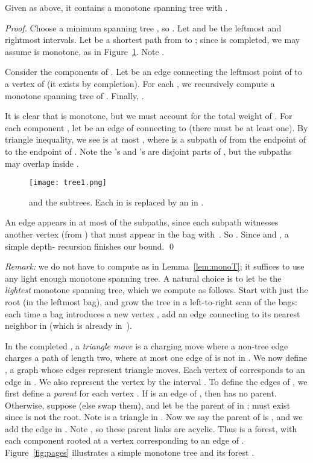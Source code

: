 \documentclass{llncs}
\begin{document}
\begin{lemma}\label{lem:monoT} Given  as above, it contains a monotone
 spanning tree  with . 
\end{lemma}
\begin{proof}
Choose a minimum spanning tree , so .
Let  and  be the leftmost and rightmost intervals.
Let  be a shortest path from  to ; since  is completed,
we may assume  is monotone, as in Figure~\ref{fig:tree1}.
Note .

Consider the components  of .
Let  be an edge connecting the leftmost point of  to a
vertex of  (it exists by completion).
For each , we recursively compute a monotone spanning tree 
of . Finally, .

It is clear that  is monotone, but we must account for the total
weight of .  For each component , let  be an edge
of  connecting  to  (there must be at least one).
By triangle inequality, we see  is at most , where  is a subpath of  from
the endpoint of  to the endpoint of .  Note the 's and
's are disjoint parts of , but the subpaths may overlap inside
.

\begin{figure}[ht]
\begin{center}
{\texttt{[image: tree1.png]}}
\caption{ and the  subtrees. Each 
 in  is replaced by an  in .}
\label{fig:tree1}
\end{center}
\end{figure}

An edge  appears in at most  of the
 subpaths, since each subpath witnesses another vertex (from
) that must appear in the bag with~.  So .  Since  and , a simple
depth- recursion finishes our bound.  \qed
\end{proof}

\noindent\emph{Remark:} we do not have to compute  as in
Lemma~\ref{lem:monoT}; it suffices to use any light enough monotone
spanning tree.  A natural choice is to let  be the \emph{lightest}
monotone spanning tree, which we compute as follows.  Start with just
the root (in the leftmost bag), and grow the tree in a left-to-right
scan of the bags: each time a bag  introduces a new vertex , add
an edge connecting  to its nearest neighbor in  (which is
already in~).

In the completed , a \emph{triangle move} is a charging move where
a non-tree edge  charges a path  of length two, where at most
one edge of  is not in .  We now define , a graph whose
edges represent triangle moves.  Each vertex  of 
corresponds to an edge  in .  We also represent the vertex
 by the interval .  To define the edges of
, we first define a \emph{parent} for each vertex .  If
 is an edge of , then  has no parent.  Otherwise,
suppose  (else swap them), and let  be the
parent of  in ;  must exist since  is not the root.  Note
 is a triangle in .  Now we say the parent of  is
, and we add the edge  in .  Note
, so these parent links are acyclic. Thus
 is a forest, with each component rooted at a vertex
corresponding to an edge of .  Figure~\ref{fig:pages} illustrates a
simple monotone tree  and its forest .
\end{document}

